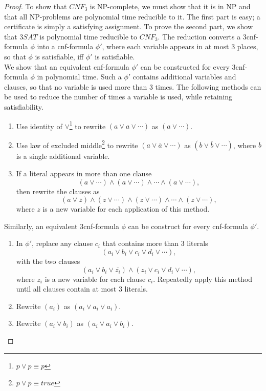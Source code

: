 \documentclass[11pt]{article}
\begin{document}
\begin{proof}
To show that $CNF_3$ is NP-complete, we must show that it is in NP and that all NP-problems are polynomial time reducible to it. The first part is easy; a certificate is simply a satisfying assignment. To prove the second part, we show that $3SAT$ is polynomial time reducible to $CNF_3$. The reduction converts a 3cnf-formula $\phi$ into a cnf-formula $\phi'$, where each variable appears in at most 3 places, so that $\phi$ is satisfiable, iff $\phi'$ is satisfiable. \\

We show that an equivalent cnf-formula $\phi'$ can be constructed for every 3cnf-formula $\phi$ in polynomial time. Such a $\phi'$ contains additional variables and clauses, so that no variable is used more than 3 times. The following methods can be used to reduce the number of times a variable is used, while retaining satisfiability.
\begin{enumerate}
\item Use identity of $\vee$\footnote{$p \vee p \equiv p$} to rewrite $(a \vee a \vee \cdots)$ as $(a \vee \cdots)$.
\item Use law of excluded middle\footnote{$p \vee \overline{p} \equiv true$} to rewrite $(a \vee \overline{a} \vee \cdots)$ as $(b \vee \overline{b} \vee \cdots)$, where $b$ is a single additional variable.
\item If a literal appears in more than one clause
\[
(a \vee \cdots) \wedge (a \vee \cdots) \wedge \cdots \wedge (a \vee \cdots),
\]
then rewrite the clauses as
\[
(a \vee \overline{z}) \wedge (z \vee \cdots) \wedge (z \vee \cdots) \wedge \cdots \wedge (z \vee \cdots),
\]
where $z$ is a new variable for each application of this method.
\end{enumerate}

Similarly, an equivalent 3cnf-formula $\phi$ can be construct for every cnf-formula $\phi'$.

\begin{enumerate}
\item In $\phi'$, replace any clause $c_i$ that contains more than 3 literals
\[
(a_i \vee b_i \vee c_i \vee d_i \vee \cdots),
\]
with the two clauses
\[
(a_i \vee b_i \vee \overline{z_i}) \wedge (z_i \vee c_i \vee d_i \vee \cdots),
\]
where $z_i$ is a new variable for each clause $c_i$. Repeatedly apply this method until all clauses contain at most 3 literals.
\item Rewrite $(a_i)$ as $(a_i \vee a_i \vee a_i)$.
\item Rewrite $(a_i \vee b_i)$ as $(a_i \vee a_i \vee b_i)$.
\end{enumerate}

\end{proof}
\end{document}
